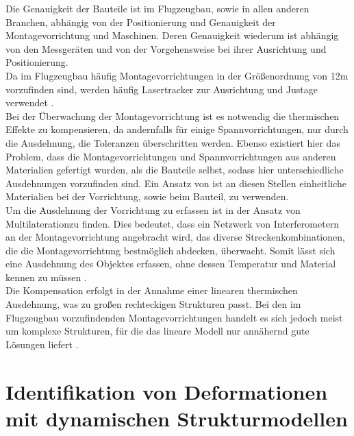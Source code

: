 Die Genauigkeit der Bauteile ist im Flugzeugbau, sowie in allen anderen Branchen, abhängig von der Positionierung und Genauigkeit der Montagevorrichtung und Maschinen. Deren Genauigkeit wiederum ist abhängig von den Messgeräten und von der Vorgehensweise bei ihrer Ausrichtung und Positionierung. \\
Da im Flugzeugbau häufig Montagevorrichtungen in der Größenordnung von 12m vorzufinden sind, werden häufig Lasertracker zur Ausrichtung und Justage verwendet \cite{Muelaner2011}.\\
Bei der Überwachung der Montagevorrichtung ist es notwendig die thermischen Effekte zu kompensieren, da andernfalls für einige Spannvorrichtungen, nur durch die Ausdehnung, die Toleranzen überschritten werden. Ebenso existiert hier das Problem, dass die Montagevorrichtungen und Spannvorrichtungen aus anderen Materialien gefertigt wurden, als die Bauteile selbst, sodass hier unterschiedliche Ausdehnungen vorzufinden sind. Ein Ansatz von \cite{Muelaner2011} ist an diesen Stellen einheitliche Materialien bei der Vorrichtung, sowie beim Bauteil, zu verwenden.\\
Um die Ausdehnung der Vorrichtung zu erfassen ist in \cite{Muelaner2011} der Ansatz von \glqq Multilateration\grqq zu finden. Dies bedeutet, dass ein Netzwerk von Interferometern an der Montagevorrichtung angebracht wird, das diverse Streckenkombinationen, die die Montagevorrichtung bestmöglich abdecken, überwacht. Somit lässt sich eine Ausdehnung des Objektes erfassen, ohne dessen Temperatur und Material kennen zu müssen \cite{Muelaner2011}.\\
Die Kompensation erfolgt in der Annahme einer linearen thermischen Ausdehnung, was zu großen rechteckigen Strukturen passt. Bei den im Flugzeugbau vorzufindenden Montagevorrichtungen handelt es sich jedoch meist um komplexe Strukturen, für die das lineare Modell nur annähernd gute Lösungen liefert \cite{Muelaner2011}.

\section{Identifikation von Deformationen mit dynamischen Strukturmodellen}\label{sec:stahlsäule}


